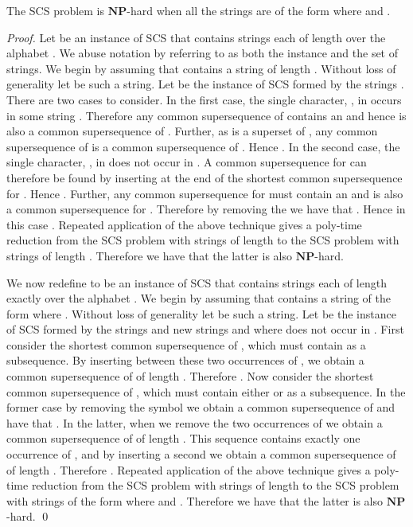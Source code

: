 \documentclass[a4paper,11pt]{llncs}
\newcounter{l}
\newcommand{\NPtime}{\ensuremath{\mathbf{NP}}}
\newcommand{\SCS}{\textsc{SCS}}
\begin{document}
\begin{lemma}
    \label{lem:SCSab}
    The \SCS{} problem is \NPtime-hard when all the strings are of the form  where  and .
\end{lemma}
\begin{proof}
Let  be an instance of \SCS{} that contains  strings  each of length  over the alphabet . We abuse notation by referring to  as both the instance and the set of  strings. We begin by assuming that  contains a string of length . Without loss of generality let  be such a string. Let  be the instance of \SCS{} formed by the  strings . There are two cases to consider. In the first case, the single character, , in  occurs in some string . Therefore any common supersequence of  contains an  and hence is also a common supersequence of . Further, as  is a superset of , any common supersequence of  is a common supersequence of . Hence . In the second case, the single character, , in  does not occur in . A common supersequence for  can therefore be found by inserting  at the end of the shortest common supersequence for . Hence . Further, any common supersequence for  must contain an  and is also a common supersequence for . Therefore by removing the  we have that . Hence in this case . Repeated application of the above technique gives a poly-time reduction from the \SCS{} problem with strings of length  to  the \SCS{} problem with strings of length . Therefore we have that the latter is also \NPtime-hard.

We now redefine  to be an instance of \SCS{} that contains  strings  each of length exactly  over the alphabet . We begin by assuming that  contains a string of the form  where . Without loss of generality let  be such a string. Let  be the instance of \SCS{} formed by the  strings  and new strings  and  where  does not occur in . First consider the shortest common supersequence of , which must contain  as a subsequence. By inserting  between these two occurrences of , we obtain a common supersequence of  of length . Therefore . Now consider the shortest common supersequence of , which must contain either  or  as a subsequence. In the former case by removing the  symbol we obtain a common supersequence of  and have that . In the latter, when we remove the two occurrences of  we obtain a common supersequence of  of length . This sequence contains exactly one occurrence of , and by inserting a second we obtain a common supersequence of  of length . Therefore . Repeated application of the above technique gives a poly-time reduction from the \SCS{} problem with strings of length  to  the \SCS{} problem with strings of the form  where  and . Therefore we have that the latter is also \NPtime-hard. \qed
\end{proof}
\end{document}
